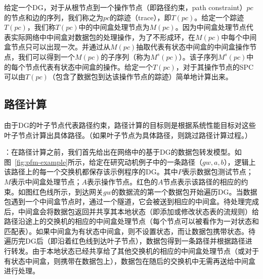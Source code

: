 给定一个DG，对于从根节点到一个操作节点（即路径约束，path constraint）$pc$的节点和边的序列，我们称之为$pc$的踪迹（trace），即$T(pc)$。给定一个踪迹$T(pc)$，我们称$T(pc)$中的中间盒处理节点为$M(pc)$。因为中间盒处理节点代表实际网络中中间盒对数据包的处理操作，为了不形成环，在$M(pc)$中每个中间盒节点只可以出现一次。并通过从$M(pc)$抽取代表有状态中间盒的中间盒操作节点，我们可以得到一个$M(pc)$的子序列（称为$M^s(pc)$）。该子序列$M^s(pc)$中的每个节点代表有状态中间盒的操作。给定一个$T(pc)$，对于其操作节点的SPC可以由$T(pc)$（包含了数据包到达该操作节点的踪迹）简单地计算出来。


\subsection{路径计算}

由于DG的叶子节点代表路径约束，路径计算的目标则是根据系统性能目标对这些叶子节点计算出具体路径。（如果叶子节点为具体路径，则跳过路径计算过程。）


：在路径计算之前，我们首先给出在网络中的基于DG的数据包转发模型。如图~\ref{fig:pfm-example}所示，给定在研究动机例子中的一条路径（$gw, a, b$），逻辑上该路径上的每一个交换机都保存该示例程序的DG。其中$P$表示数据包测试节点；$M$表示中间盒处理节点；$A$表示操作节点。红色的$A$节点表示该路径的相应的约束。如图红色线所示，到达网关$gw$的数据流的第一个数据包开始遍历DG。当数据包遇到一个中间盒节点时，通过一个隧道，它会被送到相应的中间盒。待处理完成后，中间盒会将数据包返回并共享其本地状态（即添加或修改状态表的流规则）给路径沿途上的交换机的相应的中间盒处理节点（每个节点可以被看作为一对状态和匹配表）。如果中间盒为有状态中间盒，则不设置状态，而让数据包携带状态。待遍历完DG后（即沿着红色线到达叶子节点），数据包得到一条路径并根据路径进行转发。由于本地状态已经共享给了其他交换机的相应的中间盒处理节点（或对于有状态中间盒，则携带在数据包上），数据包在随后的交换机中无需再送给中间盒进行处理。

